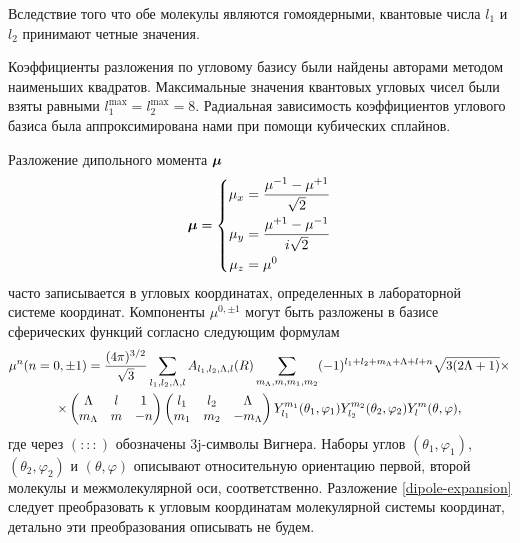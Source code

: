 Вследствие того что обе молекулы являются гомоядерными, квантовые числа $l_1$ и $l_2$ принимают четные значения. \par
Коэффициенты разложения по угловому базису были найдены авторами \cite{karman2015} методом наименьших квадратов. Максимальные значения квантовых угловых чисел были взяты равными $l_1^\text{max} = l_2^\text{max} = 8$.  Радиальная зависимость коэффициентов углового базиса была аппроксимирована нами при помощи кубических сплайнов.  \par
Разложение дипольного момента $\boldsymbol{\mu}$ 
\begin{gather}
    \boldsymbol{\mu} = \left\{
    \begin{aligned}
        \mu_x &= \frac{\mu^{-1} - \mu^{+1}}{\sqrt{2}} \\
        \mu_y &= \frac{\mu^{+1} - \mu^{-1}}{i \sqrt{2}} \\
        \mu_z &= \mu^0
    \end{aligned}
    \right.
\end{gather}
%
часто записывается в угловых координатах, определенных в лабораторной системе координат. Компоненты $\mu^{0, \pm 1}$ могут быть разложены в базисе сферических функций согласно следующим формулам \cite{hartmann2011} 
\begin{gather}
    \mu^n (n = 0, \pm 1) = \frac{( 4 \pi )^{3/2}}{\sqrt{3}} \sum_{l_1, l_2, \Lambda, l} A_{l_1, l_2, \Lambda, l}(R) \sum_{m_\Lambda, m, m_1, m_2} (-1)^{l_1 + l_2 + m_\Lambda + \Lambda + l + n} \sqrt{3 (2\Lambda + 1)} \times \notag \\
    \times
    \begin{pmatrix}
        \Lambda & l & 1 \\ m_\Lambda & m & -n 
    \end{pmatrix}
    \begin{pmatrix}
        l_1 & l_2 & \Lambda \\
        m_1 & m_2 & -m_\Lambda
    \end{pmatrix}
    Y_{l_1}^{m_1}(\theta_1, \varphi_1) Y_{l_2}^{m_2}(\theta_2, \varphi_2) Y_l^m(\theta, \varphi), \label{dipole-expansion} 
\end{gather}
%
где через $(:::)$ обозначены 3j-символы Вигнера. Наборы углов $(\theta_1, \varphi_1)$, $(\theta_2, \varphi_2)$ и $(\theta, \varphi)$ описывают относительную ориентацию первой, второй молекулы и межмолекулярной оси, соответственно. Разложение \eqref{dipole-expansion} следует преобразовать к угловым координатам молекулярной системы координат, детально эти преобразования описывать не будем. \par
